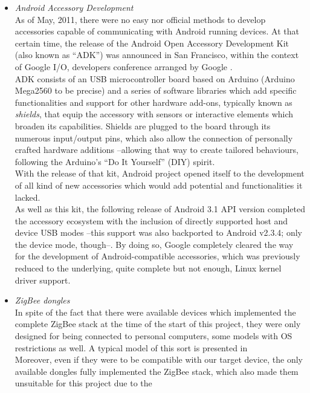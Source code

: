 \begin{itemize}
			\item \emph{Android Accessory Development}\\
				As of May, 2011, there were no easy nor official methods to develop
				accessories capable of communicating with Android running devices. At that
				certain time, the release of the Android Open Accessory Development Kit (also known as ``ADK'')
				\cite{ADK} was announced in San Francisco, within the context of Google I/O, developers
				conference arranged by Google \cite{GoogleIO}.\\
				ADK consists of an USB microcontroller board based on Arduino (Arduino Mega2560 to be precise) and a
				series of software libraries which add specific functionalities and support for other hardware add-ons,
				typically known as \emph{shields}, that equip the accessory with sensors or interactive elements
				which broaden its capabilities. Shields are plugged to the board through its numerous input/output
				pins, which also allow the connection of personally crafted hardware additions --allowing that way to
				create tailored behaviours, following the Arduino's ``Do It Yourself'' (DIY) spirit.\\
				With the release of that kit, Android project opened itself to the development
				of all kind of new accessories which would add potential and functionalities
				it lacked.\\
				As well as this kit, the following release of Android 3.1 API version completed
				the accessory ecosystem with the inclusion of directly supported host and device
				USB modes --this support was also backported to Android v2.3.4; only the device mode, though--.
				By doing so, Google completely cleared the way for the development of Android-compatible accessories, 
				which was previously reduced to the underlying, quite complete but not enough, Linux kernel driver 
				support.\\
			\item \emph{ZigBee dongles}\\
				In spite of the fact that there were available devices which implemented the complete ZigBee
				stack at the time of the start of this project, they were only designed for being connected to
				personal computers, some models with OS restrictions as well. A typical model of this sort is
				presented in \cite{dongle}\\
				Moreover, even if they were to be compatible with our target device, the only available dongles
				fully implemented the ZigBee stack, which also made them unsuitable for this project due to the

\end{itemize}
